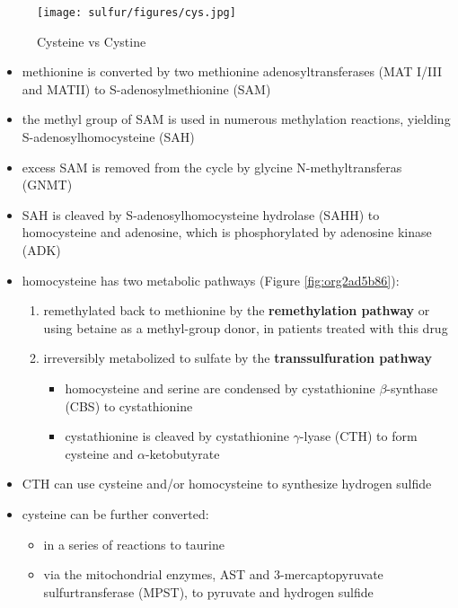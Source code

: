 \documentclass{scrartcl}
\begin{document}
\chemnameinit{}
\chemnameinit{}


\begin{figure}[htbp]
\centering
\texttt{[image: sulfur/figures/cys.jpg]}
\caption{\label{fig:orgf37bdce}Cysteine vs Cystine}
\end{figure}

\begin{itemize}
\item methionine is converted by two methionine adenosyltransferases (MAT
I/III and MATII) to S-adenosylmethionine (SAM)
\item the methyl group of SAM is used in numerous methylation reactions,
yielding S-adenosylhomocysteine (SAH)
\item excess SAM is removed from the cycle by glycine N-methyltransferas (GNMT)
\item SAH is cleaved by S-adenosylhomocysteine hydrolase (SAHH) to
homocysteine and adenosine, which is phosphorylated by adenosine
kinase (ADK)
\item homocysteine has two metabolic pathways (Figure \ref{fig:org2ad5b86}):
\begin{enumerate}
\item remethylated back to methionine by the \textbf{remethylation pathway} or
using betaine as a methyl-group donor, in patients treated with
this drug
\item irreversibly metabolized to sulfate
by the \textbf{transsulfuration pathway}
\begin{itemize}
\item homocysteine and serine are condensed by cystathionine
\(\beta\)-synthase (CBS) to cystathionine
\item cystathionine is cleaved by cystathionine \(\gamma\)-lyase (CTH) to
form cysteine and \(\alpha\)-ketobutyrate
\end{itemize}
\end{enumerate}
\item CTH can use cysteine and/or homocysteine to synthesize hydrogen
sulfide
\item cysteine can be further converted:
\begin{itemize}
\item in a series of reactions to taurine
\item via the mitochondrial enzymes, AST and 3-mercaptopyruvate
sulfurtransferase (MPST), to pyruvate and hydrogen sulfide

\end{itemize}
\end{itemize}
\end{document}
